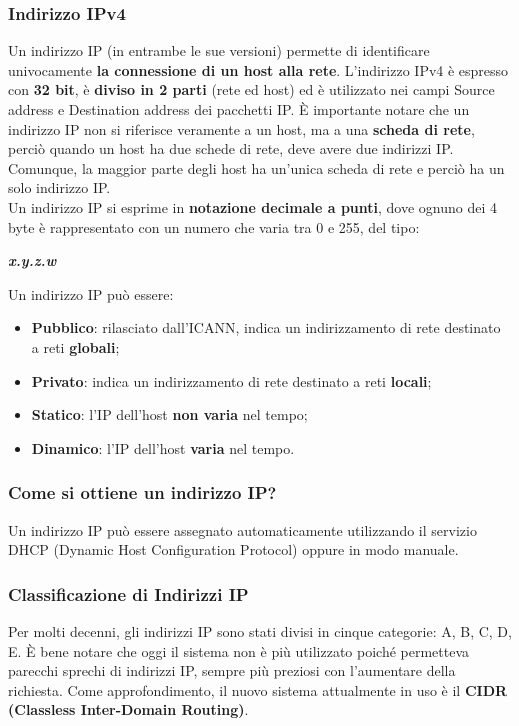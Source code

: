 \documentclass{article}
\begin{document}
            \subsubsection*{Indirizzo IPv4}
            Un indirizzo IP (in entrambe le sue versioni) permette di identificare univocamente \textbf{la
            connessione di un host alla rete}. L’indirizzo IPv4 è espresso con \textbf{32 bit}, è \textbf{diviso in 2 parti}
            (rete ed host) ed è utilizzato nei campi Source address e Destination address dei pacchetti IP. È
            importante notare che un indirizzo IP non si riferisce veramente a un host, ma a una \textbf{scheda di
            rete}, perciò quando un host ha due schede di rete, deve avere due indirizzi IP. Comunque, la
            maggior parte degli host ha un’unica scheda di rete e perciò ha un solo indirizzo IP.\\
            
            Un indirizzo IP si esprime in \textbf{notazione decimale a punti}, dove ognuno dei 4 byte è
            rappresentato con un numero che varia tra 0 e 255, del tipo:
            
            \begin{center}
                \textbf{\emph{x.y.z.w}}
            \end{center}
            Un indirizzo IP può essere:
            \begin{itemize}
                \item \textbf{Pubblico}: rilasciato dall’ICANN, indica un indirizzamento di rete destinato a reti \textbf{globali};
                \item \textbf{Privato}: indica un indirizzamento di rete destinato a reti \textbf{locali};
                \item \textbf{Statico}: l’IP dell’host \textbf{non varia} nel tempo;
                \item \textbf{Dinamico}: l’IP dell’host \textbf{varia} nel tempo.
            \end{itemize}
            \subsubsection*{Come si ottiene un indirizzo IP?}
            Un indirizzo IP può essere assegnato automaticamente utilizzando il servizio DHCP (Dynamic
            Host Configuration Protocol) oppure in modo manuale.

            \subsubsection*{Classificazione di Indirizzi IP}
            Per molti decenni, gli indirizzi IP sono stati divisi in cinque categorie: A, B, C, D, E.
            È bene notare che oggi il sistema non è più utilizzato poiché permetteva parecchi sprechi di
            indirizzi IP, sempre più preziosi con l’aumentare della richiesta. Come approfondimento, il
            nuovo sistema attualmente in uso è il \textbf{CIDR (Classless Inter-Domain Routing)}.\\
            
\end{document}
